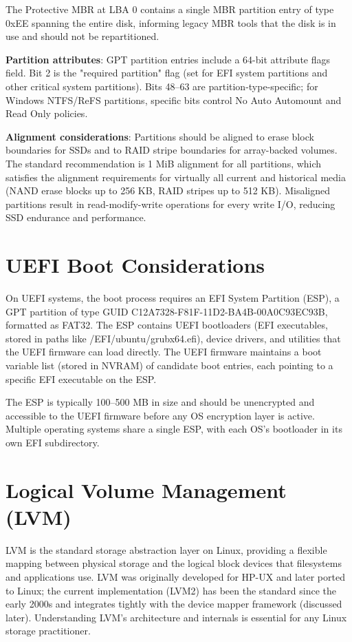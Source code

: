 The Protective MBR at LBA 0 contains a single MBR partition entry of type 0xEE spanning the entire disk, informing legacy MBR tools that the disk is in use and should not be repartitioned.

\textbf{Partition attributes}: GPT partition entries include a 64-bit attribute flags field. Bit 2 is the "required partition" flag (set for EFI system partitions and other critical system partitions). Bits 48--63 are partition-type-specific; for Windows NTFS/ReFS partitions, specific bits control No Auto Automount and Read Only policies.

\textbf{Alignment considerations}: Partitions should be aligned to erase block boundaries for SSDs and to RAID stripe boundaries for array-backed volumes. The standard recommendation is 1 MiB alignment for all partitions, which satisfies the alignment requirements for virtually all current and historical media (NAND erase blocks up to 256 KB, RAID stripes up to 512 KB). Misaligned partitions result in read-modify-write operations for every write I/O, reducing SSD endurance and performance.

\section{UEFI Boot Considerations}
On UEFI systems, the boot process requires an EFI System Partition (ESP), a GPT partition of type GUID C12A7328-F81F-11D2-BA4B-00A0C93EC93B, formatted as FAT32. The ESP contains UEFI bootloaders (EFI executables, stored in paths like /EFI/ubuntu/grubx64.efi), device drivers, and utilities that the UEFI firmware can load directly. The UEFI firmware maintains a boot variable list (stored in NVRAM) of candidate boot entries, each pointing to a specific EFI executable on the ESP.

The ESP is typically 100--500 MB in size and should be unencrypted and accessible to the UEFI firmware before any OS encryption layer is active. Multiple operating systems share a single ESP, with each OS's bootloader in its own EFI subdirectory.

\section{Logical Volume Management (LVM)}
LVM is the standard storage abstraction layer on Linux, providing a flexible mapping between physical storage and the logical block devices that filesystems and applications use. LVM was originally developed for HP-UX and later ported to Linux; the current implementation (LVM2) has been the standard since the early 2000s and integrates tightly with the device mapper framework (discussed later). Understanding LVM's architecture and internals is essential for any Linux storage practitioner.

